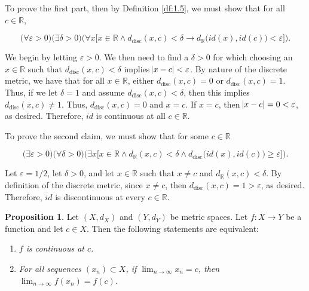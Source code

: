 \documentclass{article}
\makeatletter
\theoremstyle{definition}
\newtheorem{prop}{Proposition}[section]
\theoremstyle{remark}
\let\oldproofname=\proofname
\renewcommand{\proofname}{\bf{\textit{\oldproofname}}}
\theoremstyle{definition}
\renewenvironment{proof}[1][\proofname]{\par
  \pushQED{\qed}%
  \normalfont \topsep6\p@\@plus6\p@\relax
  \list{}{\leftmargin=0mm
          \rightmargin=0mm
          \settowidth{\itemindent}{\itshape#1}%
          \labelwidth=\itemindent
          \parsep=0pt \listparindent=0mm%
  }
  \item[\hskip\labelsep
        \itshape
    #1\@addpunct{.}]\ignorespaces
}{%
  \popQED\endlist\@endpefalse
}
\makeatother
\begin{document}
    \begin{proof}
        To prove the first part, then by Definition \ref{df:1.5}, we must show that for all $c\in\mathbb{R}$,
        
        \begin{equation}
            \big(\forall\varepsilon>0\big)\big(\exists\delta>0\big)\big(\forall x\big[x\in\mathbb{R}\wedge d_{\text{disc}}(x,c)<\delta\rightarrow d_{\mathbb{R}}\big(id(x),id(c)\big)<\varepsilon\big]\big).
        \end{equation}
        
        We begin by letting $\varepsilon>0$. We then need to find a $\delta>0$ for which choosing an $x\in\mathbb{R}$ such that $d_{\text{disc}}(x,c)<\delta$ implies $\abs{x-c}<\varepsilon$. By nature of the discrete metric, we have that for all $x\in\mathbb{R}$, either $d_{\text{disc}}(x,c)=0$ or $d_{\text{disc}}(x,c)=1$. Thus, if we let $\delta=1$ and assume $d_{\text{disc}}(x,c)<\delta$, then this implies $d_{\text{disc}}(x,c)\neq 1$. Thus, $d_{\text{disc}}(x,c)=0$ and $x=c$. If $x=c$, then $\abs{x-c}=0<\varepsilon$, as desired. Therefore, $id$ is continuous at all $c\in\mathbb{R}$. \par\hspace{4mm}To prove the second claim, we must show that for some $c\in\mathbb{R}$
        
        \begin{equation}
            \big(\exists\varepsilon>0\big)\big(\forall\delta>0\big)\big(\exists x\big[x\in\mathbb{R}\wedge d_{\mathbb{R}}(x,c)<\delta\wedge d_{\text{disc}}\big(id(x),id(c)\big)\geq \varepsilon\big]\big).
        \end{equation}
        
        Let $\varepsilon=1/2$, let $\delta>0$, and let $x\in\mathbb{R}$ such that $x\neq c$ and $d_{\mathbb{R}}(x,c)<\delta$. By definition of the discrete metric, since $x\neq c$, then $d_{\text{disc}}(x,c)=1>\varepsilon$, as desired. Therefore, $id$ is discontinuous at every $c\in\mathbb{R}$. 
    \end{proof}
    
    \begin{prop}\label{prop:1.7}
        Let $(X,d_X)$ and $(Y,d_Y)$ be metric spaces. Let $f\colon X\rightarrow Y$ be a function and let $c\in X$. Then the following statements are equivalent:
    
        \begin{enumerate}[label=(\roman*)]
            \item \textit{$f$ is continuous at $c$.}
            \item \textit{For all sequences $(x_n)\subset X$, if $\displaystyle{\lim_{n\rightarrow\infty}x_n=c}$, then $\displaystyle{\lim_{n\rightarrow\infty}f(x_n)=f(c)}$.}
        \end{enumerate}
    \end{prop}
    
\end{document}
